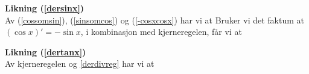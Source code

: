 {\textbf{Likning (\ref{dersinx})}\\
Av (\ref{cossomsin}), (\ref{sinsomcos}) og (\ref{-cosxcosx}) har vi at
Bruker vi det faktum at $ {(\cos x)'=-\sin x} $, i kombinasjon med kjerneregelen, får vi at

\textbf{Likning (\ref{dertanx})}\\
Av kjerneregelen og \eqref{derdivreg} har vi at
}



